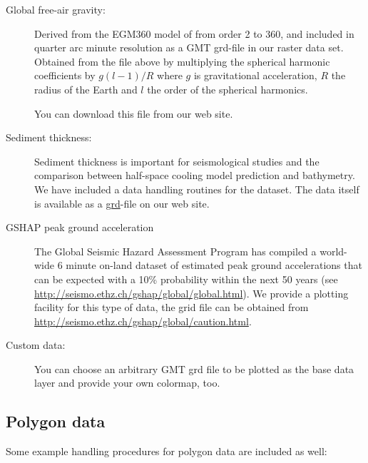 \documentclass[11pt]{article}
\begin{document}
\begin{description}
\item[Global free-air gravity:] Derived from the EGM360 model of
  \cite{rapp91,rapp96} from order 2 to 360, and included in quarter
  arc minute resolution as a GMT grd-file in our raster data set.
  Obtained from the file above by multiplying the spherical harmonic
  coefficients by $g(l-1)/R$ where $g$ is gravitational acceleration,
  $R$ the radius of the Earth and $l$ the order of the spherical
  harmonics.

  You can download this file from our web site.

  
\item[Sediment thickness:] Sediment thickness is important for
  seismological studies and the comparison between half-space cooling
  model prediction and bathymetry. We have included a data handling
  routines for the \cite{laske97} dataset. The data itself is
  available as a \url{grd}-file on our web site.
  
\item[GSHAP peak ground acceleration] The Global Seismic Hazard
  Assessment Program \cite[GSHAP,][]{giardini99,giardini00} has compiled a
  world-wide 6 minute on-land dataset of estimated peak ground
  accelerations that can be expected with a 10\% probability within
  the next 50 years (see 
  \url{http://seismo.ethz.ch/gshap/global/global.html}). We provide a
  plotting facility for this type of data, the grid file can be
  obtained from\\ \url{http://seismo.ethz.ch/gshap/global/caution.html}.
  

  
\item[Custom data:] You can choose an arbitrary GMT grd file to be
  plotted as the base data layer and provide your own colormap, too.
\end{description}


\subsection{Polygon data}

Some example handling procedures for polygon data are included as well:
\end{document}
